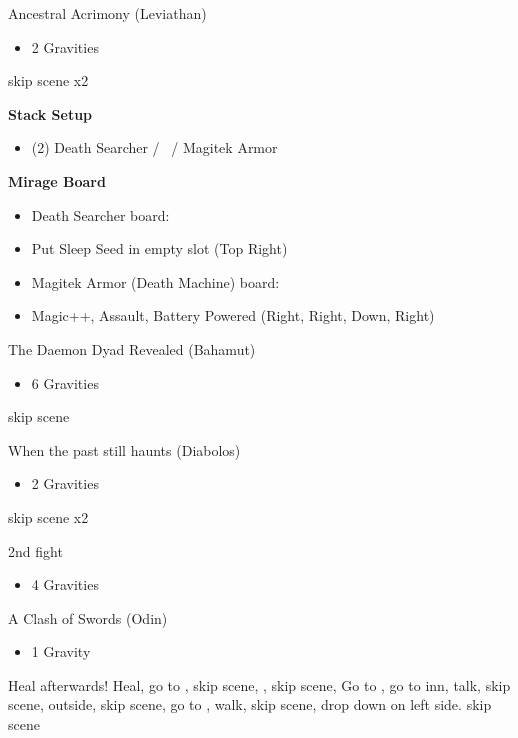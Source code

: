 \begin{battle}[]{Ancestral Acrimony (Leviathan)}
    \begin{itemize}
        \item 2 Gravities
    \end{itemize}
\end{battle}
skip scene x2
\begin{menu}
\textbf{Stack Setup}
    \begin{itemize}
        \item (2) Death Searcher / \lann\ / Magitek Armor
    \end{itemize}
\textbf{Mirage Board}
    \begin{itemize}
        \item Death Searcher board:
        \item Put Sleep Seed in empty slot (Top Right)
        \item Magitek Armor (Death Machine) board:
        \item Magic++, Assault, Battery Powered (Right, Right, Down, Right)
    \end{itemize}
\end{menu}
\begin{battle}[]{The Daemon Dyad Revealed (Bahamut)}
    \begin{itemize}
        \item 6 Gravities
    \end{itemize}
\end{battle}
skip scene
\begin{battle}[]{When the past still haunts (Diabolos)}
    \begin{itemize}
        \item 2 Gravities
    \end{itemize}
\end{battle}
skip scene x2
\begin{battle}[]{2nd fight}
    \begin{itemize}
        \item 4 Gravities
    \end{itemize}
\end{battle}
\begin{battle}[]{A Clash of Swords (Odin)}
    \begin{itemize}
        \item 1 Gravity
    \end{itemize}
\end{battle}
Heal afterwards!
Heal, go to , skip scene, 
, skip scene, 
Go to , go to inn, talk, skip scene, 
outside, skip scene, 
go to , walk, skip scene, 
drop down on left side. skip scene
 

